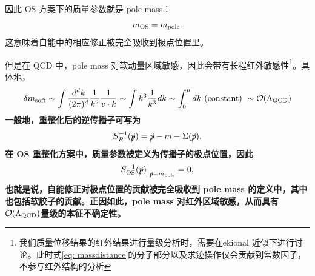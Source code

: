 因此 OS 方案下的质量参数就是 pole mass：
\begin{equation}
m_{\rm OS}=m_{\rm pole}.
\end{equation}
这意味着自能中的相应修正被完全吸收到极点位置里。

但是在 QCD 中，pole mass 对软动量区域敏感，因此会带有长程红外敏感性\footnote{我们质量位移结果的红外结果进行量级分析时，需要在ekional 近似下进行讨论。此时式\eqref{eq: massdistance}的分子部分以及求迹操作仅会贡献到常数因子，不参与红外结构的分析}。具体地，
\begin{equation}
\delta m_{\mathrm{soft}} \sim \int \frac{d^d k}{(2 \pi)^d} \frac{1}{k^2} \frac{1}{v \cdot k} \sim \int k^3 \frac{1}{k^3} d k \sim \int_0^\mu d k \text { (constant) }\sim \mathcal{O}(\Lambda_{\rm QCD})
\end{equation}
\textbf{
一般地，重整化后的逆传播子可写为
\[
S_R^{-1}(\slashed p)=\slashed p-m-\Sigma(\slashed p).
\]
在 OS 重整化方案中，质量参数被定义为传播子的极点位置，因此
\[
S_{\rm OS}^{-1}(\slashed p)\big|_{\slashed p=m_{\rm pole}}=0,
\]
也就是说，自能修正对极点位置的贡献被完全吸收到 pole mass 的定义中，其中也包括软胶子的贡献。正因如此，pole mass 对红外区域敏感，从而具有$
\mathcal O(\Lambda_{\rm QCD})
$量级的本征不确定性。}